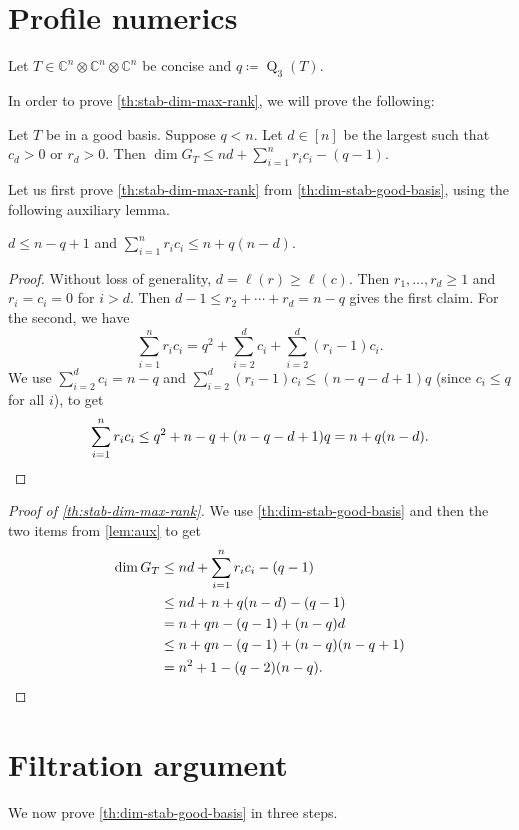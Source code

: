\documentclass[11pt,a4paper]{article}
\numberwithin{equation}{section}
\DeclareMathOperator{\subrank}{Q}
\newcommand{\CC}{\mathbb{C}}
\begin{document}
\section{Profile numerics}

Let $T \in \CC^n \otimes \CC^n \otimes \CC^n$ be concise and $q \coloneqq \subrank_3(T)$.

In order to prove \cref{th:stab-dim-max-rank}, we will prove the following:

\begin{theorem}\label{th:dim-stab-good-basis}
Let $T$ be in a good basis. Suppose $q < n$. Let $d \in [n]$ be the largest such that $c_d > 0$ or $r_d > 0$. Then $\dim G_T \leq nd + \sum_{i=1}^n r_i c_i - (q-1)$.
\end{theorem}

Let us first prove \cref{th:stab-dim-max-rank} from \cref{th:dim-stab-good-basis}, using the following auxiliary lemma. %

\begin{lemma}\label{lem:aux}
$d \leq n-q + 1$ and $\sum_{i=1}^n r_i c_i \leq n + q(n-d)$.
\end{lemma}
\begin{proof}
	Without loss of generality, $d = \ell(r) \geq \ell(c)$. Then $r_1, \ldots, r_d \geq 1$ and $r_i = c_i = 0$ for $i > d$. Then $d-1 \leq r_2 + \cdots + r_d = n-q$ gives the first claim. For the second, we have
	\[
	\sum_{i=1}^n r_i c_i = q^2 + \sum_{i=2}^d c_i + \sum_{i=2}^d (r_i - 1)c_i.
	\]
	We use $\sum_{i=2}^d c_i = n-q$ and $\sum_{i=2}^d (r_i - 1)c_i \leq (n-q-d+1)q$ (since $c_i \leq q$ for all $i$), to get
	\[
	\sum_{i=1}^n r_i c_i \leq q^2 + n-q + (n-q-d+1)q = n+q(n-d).\qedhere
	\]
\end{proof}

\begin{proof}[Proof of \cref{th:stab-dim-max-rank}]
	We use \cref{th:dim-stab-good-basis} and then the two items from \cref{lem:aux} to get
	\begin{align*}
		\dim G_T &\leq nd + \sum_{i=1}^n r_i c_i - (q-1) \\
		&\leq nd + n + q(n-d) - (q-1) \\
		&= n + qn - (q-1) + (n-q)d \\
		&\leq n + qn - (q-1) + (n-q)(n-q+1)\\
		&= n^2 + 1 - (q-2)(n-q).\qedhere
	\end{align*}
\end{proof}

\section{Filtration argument}\label{sec:filtration}
We now prove \cref{th:dim-stab-good-basis} in three steps.
\end{document}
